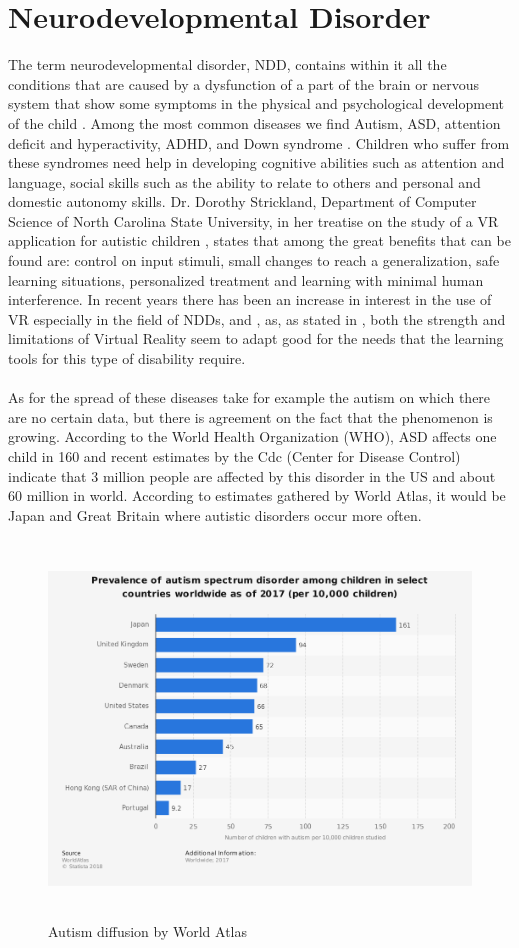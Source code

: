 \section{Neurodevelopmental Disorder}
The term neurodevelopmental disorder, NDD, contains within it all the conditions that are caused by a dysfunction of a part of the brain or nervous system that show some symptoms in the physical and psychological development of the child \cite{EPA}. Among the most common diseases we find Autism, ASD, attention deficit and hyperactivity, ADHD, and Down syndrome \cite{APA}. Children who suffer from these syndromes need help in developing cognitive abilities such as attention and language, social skills such as the ability to relate to others and personal and domestic autonomy skills. Dr. Dorothy Strickland, Department of Computer Science of North Carolina State University, in her treatise on the study of a VR application for autistic children \cite{Dorothy}, states that among the great benefits that can be found are: control on input stimuli, small changes to reach a generalization, safe learning situations, personalized treatment and learning with minimal human interference. In recent years there has been an increase in interest in the use of VR especially in the field of NDDs, \cite{Yufang} and \cite{Garzotto}, as, as stated in \cite{Strickland}, both the strength and limitations of Virtual Reality seem to adapt good for the needs that the learning tools for this type of disability require.\\
\\
As for the spread of these diseases take for example the autism on which there are no certain data, but there is agreement on the fact that the phenomenon is growing. According to the World Health Organization (WHO), ASD affects one child in 160 and recent estimates by the Cdc (Center for Disease Control) indicate that 3 million people are affected by this disorder in the US and about 60 million in world. According to estimates gathered by World Atlas, it would be Japan and Great Britain where autistic disorders occur more often.
\begin{figure}[H]
\centering
\includegraphics[width=15cm, height=10cm]{immagini/autismo.png}
\caption{Autism diffusion by World Atlas}\label{fig:autism}
\end{figure}

